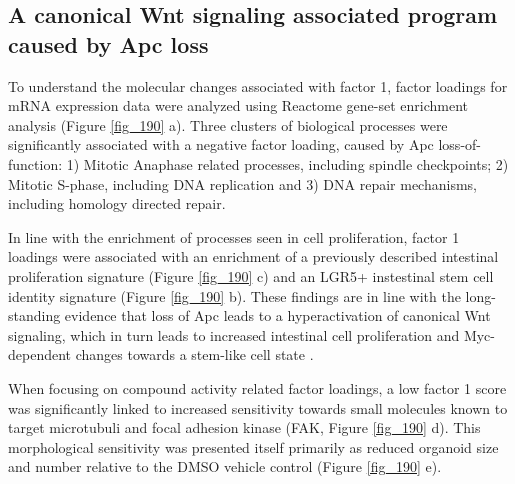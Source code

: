 \begin{flushleft}
\section{A canonical Wnt signaling associated program caused by Apc loss}

To understand the molecular changes associated with factor 1, factor loadings for mRNA expression data were analyzed using Reactome gene-set enrichment analysis (Figure \ref{fig_190} a). Three clusters of biological processes were significantly associated with a negative factor loading, caused by Apc loss-of-function: 1) Mitotic Anaphase related processes, including spindle checkpoints; 2) Mitotic S-phase, including DNA replication and 3) DNA repair mechanisms, including homology directed repair. 

\smallbreak
In line with the enrichment of processes seen in cell proliferation, factor 1 loadings were associated with an enrichment of a previously described intestinal proliferation signature (Figure \ref{fig_190} c) and an LGR5+ instestinal stem cell identity signature (Figure \ref{fig_190} b). These findings are in line with the long-standing evidence that loss of Apc leads to a hyperactivation of canonical Wnt signaling, which in turn leads to increased intestinal cell proliferation and Myc-dependent changes towards a stem-like cell state \cite{Sansom2007-wm, Satoh2017-nd}.


\smallbreak
When focusing on compound activity related factor loadings, a low factor 1 score was significantly linked to increased sensitivity towards small molecules known to target microtubuli and focal adhesion kinase (FAK, Figure \ref{fig_190} d). This morphological sensitivity was presented itself primarily as reduced organoid size and number relative to the DMSO vehicle control (Figure \ref{fig_190} e).



\end{flushleft}

